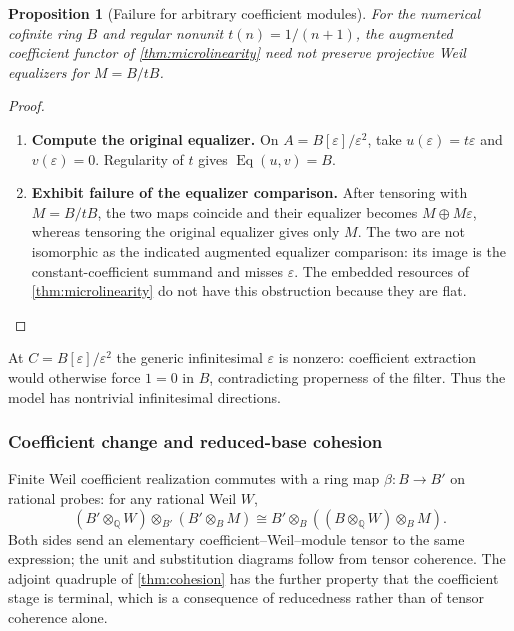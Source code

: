 \documentclass[11pt,a4paper]{article}
\numberwithin{algorithm}{section}
\numberwithin{equation}{section}
\newtheorem{proposition}[proposition]{Proposition}
\theoremstyle{definition}
\theoremstyle{remark}
\theoremstyle{plain}
\newcommand{\QQ}{\mathbb Q}
\newcommand{\eps}{\varepsilon}
\theoremstyle{definition}
\theoremstyle{plain}
\begin{document}
\begin{proposition}[Failure for arbitrary coefficient modules]
\label{prop:nonflat-weil}
For the numerical cofinite ring $B$ and regular nonunit
$t(n)=1/(n+1)$, the augmented coefficient functor of
\cref{thm:microlinearity} need not preserve projective Weil
equalizers for $M=B/tB$.
\end{proposition}
\begin{proof}\leavevmode
\begin{enumerate}[leftmargin=*,align=left]
\item \textbf{Compute the original equalizer.}
On $A=B[\eps]/\eps^2$, take
$u(\eps)=t\eps$ and $v(\eps)=0$.
Regularity of $t$ gives $\operatorname{Eq}(u,v)=B$.

\item \textbf{Exhibit failure of the equalizer comparison.}
After tensoring with $M=B/tB$, the two maps coincide and their
equalizer becomes $M\oplus M\eps$, whereas tensoring the
original equalizer gives only $M$.  The two are not isomorphic
as the indicated augmented equalizer comparison: its image is
the constant-coefficient summand and misses $\eps$.
The embedded resources of \cref{thm:microlinearity} do not have
this obstruction because they are flat.
\end{enumerate}
\end{proof}

At $C=B[\eps]/\eps^2$ the generic infinitesimal $\eps$ is
nonzero: coefficient extraction would otherwise force $1=0$
in $B$, contradicting properness of the filter.  Thus the
model has nontrivial infinitesimal directions.

\subsubsection{Coefficient change and reduced-base cohesion}
Finite Weil coefficient realization commutes with a ring map
$\beta:B\to B'$ on rational probes: for any rational Weil $W$,
\[
 (B'\otimes_\QQ W)\otimes_{B'}(B'\otimes_BM)
 \cong B'\otimes_B((B\otimes_\QQ W)\otimes_BM).
\]
Both sides send an elementary coefficient--Weil--module tensor
to the same expression; the unit and substitution diagrams follow
from tensor coherence.  The adjoint quadruple of
\cref{thm:cohesion} has the further property that the coefficient
stage is terminal, which is a consequence of reducedness rather
than of tensor coherence alone.
\end{document}

